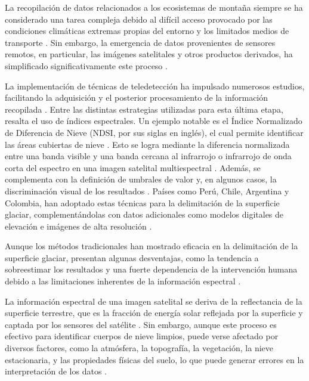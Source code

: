 La recopilación de datos relacionados a los ecosistemas de montaña siempre se ha considerado una tarea compleja debido al difícil acceso provocado por las condiciones climáticas extremas propias del entorno y los limitados medios de transporte \cite{fang2017discriminative, nijhawan2018hybrid}. Sin embargo, la emergencia de datos provenientes de sensores remotos, en particular, las imágenes satelitales y otros productos derivados, ha simplificado significativamente este proceso \cite{gavade2021systematic}.

La implementación de técnicas de teledetección ha impulsado numerosos estudios, facilitando la adquisición y el posterior procesamiento de la información recopilada \cite{zhang2019glacier}. Entre las distintas estrategias utilizadas para esta última etapa, resalta el uso de índices espectrales. Un ejemplo notable es el Índice Normalizado de Diferencia de Nieve (NDSI, por sus siglas en inglés), el cual permite identificar las áreas cubiertas de nieve \cite{hall1995mapping}. Esto se logra mediante la diferencia normalizada entre una banda visible y una banda cercana al infrarrojo o infrarrojo de onda corta del espectro en una imagen satelital multiespectral \cite{hall2010normalized}. Además, se complementa con la definición de umbrales de valor y, en algunos casos, la discriminación visual de los resultados \cite{sibandze2014comparison, singh2021quantifying}. Países como Perú, Chile, Argentina y Colombia, han adoptado estas técnicas para la delimitación de la superficie glaciar, complementándolas con datos adicionales como modelos digitales de elevación e imágenes de alta resolución \cite{inaigem2017manual, DGA2022, castro2014manual, ospina2022metodologia}.
  
Aunque los métodos tradicionales han mostrado eficacia en la delimitación de la superficie glaciar, presentan algunas desventajas, como la tendencia a sobreestimar los resultados y una fuerte dependencia de la intervención humana debido a las limitaciones inherentes de la información espectral \cite{singh2021quantifying}.

La información espectral de una imagen satelital se deriva de la reflectancia de la superficie terrestre, que es la fracción de energía solar reflejada por la superficie y captada por los sensores del satélite \cite{chuvieco2016fundamentals}. Sin embargo, aunque este proceso es efectivo para identificar cuerpos de nieve limpios, puede verse afectado por diversos factores, como la atmósfera, la topografía, la vegetación, la nieve estacionaria, y las propiedades físicas del suelo, lo que puede generar errores en la interpretación de los datos \cite{lu2020glacier, tian2022mapping}.

